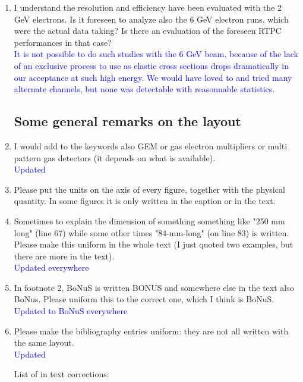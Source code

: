 \documentclass[a4paper,11pt,twoside]{article}
\begin{document}
\begin{enumerate}
\item I understand the resolution and efficiency have been evaluated with the 2 
   GeV electrons. Is it foreseen to analyze also the 6 GeV electron runs, which 
   were the actual data taking? Is there an evaluation of the foreseen RTPC 
   performances in that case?\\
\textcolor{blue}{It is not possible to do such studies with the 6 GeV beam, because 
of the lack of an exclusive process to use as elastic cross sections drops dramatically 
in our acceptance at such high energy. We would have loved to and tried many alternate
channels, but none was detectable with reasonnable statistics.} 

\subsection*{ Some general remarks on the layout}

\item I would add to the keywords also GEM or gas electron multipliers or multi 
   pattern gas detectors (it depends on what is available).\\
\textcolor{blue}{Updated} 

\item Please put the units on the axis of every figure, together with the 
   physical quantity. In some figures it is only written in the caption or in 
   the text.\\
\textcolor{blue}{ } 

\item Sometimes to explain the dimension of something something like "250 mm 
   long" (line 67) while some other times "84-mm-long" (on line 83) is written. 
   Please make this uniform in the whole text (I just quoted two examples, but 
   there are more in the text).\\
\textcolor{blue}{Updated everywhere} 

\item In footnote 2, BoNuS is written BONUS and somewhere else in the text also 
   BoNus. Please uniform this to the correct one, which I think is BoNuS.\\
\textcolor{blue}{Updated to BoNuS everywhere} 

\item Please make the bibliography entries uniform: they are not all written 
   with the same layout.\\
\textcolor{blue}{Updated} 

List of in text corrections:


\end{enumerate}
\end{document}
